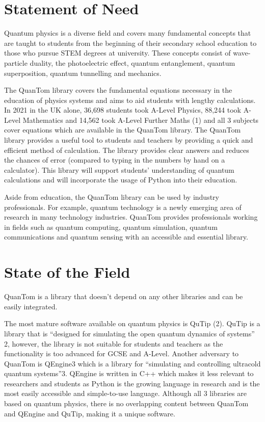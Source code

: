 \documentclass{article}
\begin{document}
\section{Statement of Need}
Quantum physics is a diverse field and covers many fundamental concepts that are taught to students from the beginning of their secondary school education to those who pursue STEM degrees at university. These concepts consist of wave-particle duality, the photoelectric effect, quantum entanglement, quantum superposition, quantum tunnelling and mechanics. 

The QuanTom library covers the fundamental equations necessary in the education of physics systems and aims to aid students with lengthy calculations. In 2021 in the UK alone, 36,698 students took  A-Level Physics, 88,244 took A-Level Mathematics and 14,562 took A-Level Further Maths (1) and all 3 subjects cover equations which are available in the QuanTom library.  The QuanTom library provides a useful tool to students and teachers by providing a quick and efficient method of calculation. The library provides clear answers and reduces the chances of error (compared to typing in the numbers by hand on a calculator). This library will support students’ understanding of quantum calculations and will incorporate the usage of Python into their education. 

Aside from education, the QuanTom library can be used by industry professionals. For example, quantum technology is a newly emerging area of research in many technology industries. QuanTom provides professionals working in fields such as quantum computing, quantum simulation, quantum communications and quantum sensing with an accessible and essential library. 


\section{State of the Field}
QuanTom is a library that doesn't depend on any other libraries and can be easily integrated.

The most mature software available on quantum physics is QuTip (2). QuTip is a library that is “designed for simulating the open quantum dynamics of systems” 2, however, the library is not suitable for students and teachers as the functionality is too advanced for GCSE and A-Level. 
Another adversary to QuanTom is QEngine3 which is a library for “simulating and controlling ultracold quantum systems”3. QEngine is written in C++ which makes it less relevant to researchers and students as Python is the growing language in research and is the most easily accessible and simple-to-use language. Although all 3 libraries are based on quantum physics, there is no overlapping content between QuanTom and QEngine and QuTip, making it a unique software.
\end{document}
